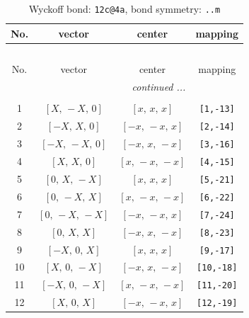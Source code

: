 \documentclass[fleqn,8pt]{jsarticle}
\begin{document}
\begin{longtable}{cccc}
\caption{Wyckoff bond: {\tt 12c@4a}, bond symmetry: {\tt ..m}}
 \\
 \hline \hline
No. & vector & center & mapping \\ \hline \endfirsthead

\multicolumn{3}{l}{\tablename\ \thetable{}} \\
 \hline \hline
No. & vector & center & mapping \\ \hline \endhead

 \hline \hline
\multicolumn{3}{r}{\footnotesize\it continued ...} \\ \endfoot

 \hline \hline
\multicolumn{3}{r}{} \\ \endlastfoot

1 & $\left[ X,\, - X,\, 0 \right]$ & $\left[ x,\, x,\, x \right]$ & {\tt [1,-13]} \\ \hline
2 & $\left[ - X,\, X,\, 0 \right]$ & $\left[ - x,\, - x,\, x \right]$ & {\tt [2,-14]} \\ \hline
3 & $\left[ - X,\, - X,\, 0 \right]$ & $\left[ - x,\, x,\, - x \right]$ & {\tt [3,-16]} \\ \hline
4 & $\left[ X,\, X,\, 0 \right]$ & $\left[ x,\, - x,\, - x \right]$ & {\tt [4,-15]} \\ \hline
5 & $\left[ 0,\, X,\, - X \right]$ & $\left[ x,\, x,\, x \right]$ & {\tt [5,-21]} \\ \hline
6 & $\left[ 0,\, - X,\, X \right]$ & $\left[ x,\, - x,\, - x \right]$ & {\tt [6,-22]} \\ \hline
7 & $\left[ 0,\, - X,\, - X \right]$ & $\left[ - x,\, - x,\, x \right]$ & {\tt [7,-24]} \\ \hline
8 & $\left[ 0,\, X,\, X \right]$ & $\left[ - x,\, x,\, - x \right]$ & {\tt [8,-23]} \\ \hline
9 & $\left[ - X,\, 0,\, X \right]$ & $\left[ x,\, x,\, x \right]$ & {\tt [9,-17]} \\ \hline
10 & $\left[ X,\, 0,\, - X \right]$ & $\left[ - x,\, x,\, - x \right]$ & {\tt [10,-18]} \\ \hline
11 & $\left[ - X,\, 0,\, - X \right]$ & $\left[ x,\, - x,\, - x \right]$ & {\tt [11,-20]} \\ \hline
12 & $\left[ X,\, 0,\, X \right]$ & $\left[ - x,\, - x,\, x \right]$ & {\tt [12,-19]} \\
\end{longtable}
\renewcommand{\arraystretch}{1.2}
\end{document}
